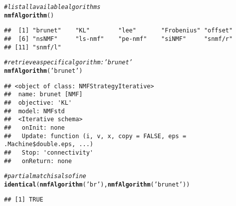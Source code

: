 \documentclass[a4paper]{article}\usepackage[]{graphicx}\usepackage[]{color}
\makeatletter
\newcommand{\hlstr}[1]{\textcolor[rgb]{0.192,0.494,0.8}{#1}}%
\newcommand{\hlcom}[1]{\textcolor[rgb]{0.678,0.584,0.686}{\textit{#1}}}%
\newcommand{\hlstd}[1]{\textcolor[rgb]{0.345,0.345,0.345}{#1}}%
\newcommand{\hlkwd}[1]{\textcolor[rgb]{0.737,0.353,0.396}{\textbf{#1}}}%
\newenvironment{kframe}{%
 \def\at@end@of@kframe{}%
 \ifinner\ifhmode%
  \def\at@end@of@kframe{\end{minipage}}%
  \begin{minipage}{\columnwidth}%
 \fi\fi%
 \def\FrameCommand##1{\hskip\@totalleftmargin \hskip-\fboxsep
 \colorbox{shadecolor}{##1}\hskip-\fboxsep
     \hskip-\linewidth \hskip-\@totalleftmargin \hskip\columnwidth}%
 \MakeFramed {\advance\hsize-\width
   \@totalleftmargin\z@ \linewidth\hsize
   \@setminipage}}%
 {\par\unskip\endMakeFramed%
 \at@end@of@kframe}
\newenvironment{knitrout}{}{} %
\makeatother
\begin{document}
\begin{knitrout}
\color{fgcolor}\begin{kframe}
\begin{alltt}
\hlcom{# list all available algorithms}
\hlkwd{nmfAlgorithm}\hlstd{()}
\end{alltt}
\begin{verbatim}
##  [1] "brunet"    "KL"        "lee"       "Frobenius" "offset"   
##  [6] "nsNMF"     "ls-nmf"    "pe-nmf"    "siNMF"     "snmf/r"   
## [11] "snmf/l"
\end{verbatim}
\begin{alltt}
\hlcom{# retrieve a specific algorithm: 'brunet' }
\hlkwd{nmfAlgorithm}\hlstd{(}\hlstr{'brunet'}\hlstd{)}
\end{alltt}
\begin{verbatim}
## <object of class: NMFStrategyIterative>
##  name: brunet [NMF]
##  objective: 'KL' 
##  model: NMFstd 
##  <Iterative schema>
##   onInit: none
##   Update: function (i, v, x, copy = FALSE, eps = .Machine$double.eps, ...)
##   Stop: 'connectivity'
##   onReturn: none
\end{verbatim}
\begin{alltt}
\hlcom{# partial match is also fine}
\hlkwd{identical}\hlstd{(}\hlkwd{nmfAlgorithm}\hlstd{(}\hlstr{'br'}\hlstd{),} \hlkwd{nmfAlgorithm}\hlstd{(}\hlstr{'brunet'}\hlstd{))}
\end{alltt}
\begin{verbatim}
## [1] TRUE
\end{verbatim}
\end{kframe}
\end{knitrout}
\end{document}
